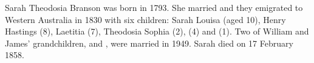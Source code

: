 
Sarah Theodosia Branson was born in 1793.
She married 
and they emigrated to Western Australia in 1830 with six children:\cite{WelcomeWalls}
Sarah Louisa (aged 10), Henry Hastings (8), Laetitia (7), Theodosia Sophia (2),
 (4) and  (1).
Two of William and James' grandchildren,  and , were married in 1949.
Sarah died on 17 February 1858.\cite{WelcomeWalls}

